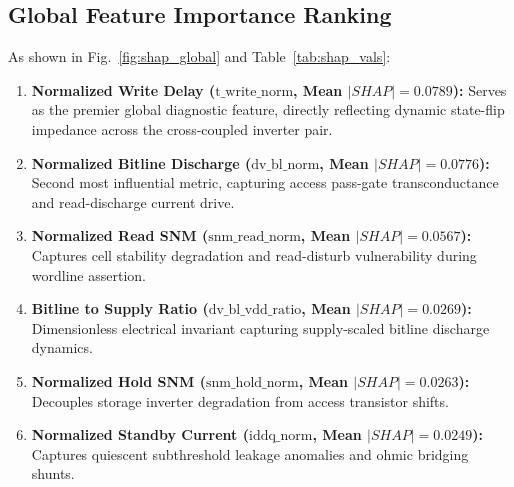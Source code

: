 \documentclass[conference]{IEEEtran}
\begin{document}
\subsection{Global Feature Importance Ranking}
As shown in Fig.~\ref{fig:shap_global} and Table~\ref{tab:shap_vals}:
\begin{enumerate}
    \item \textbf{Normalized Write Delay ($\text{t\_write\_norm}$, Mean $|SHAP| = 0.0789$):} Serves as the premier global diagnostic feature, directly reflecting dynamic state-flip impedance across the cross-coupled inverter pair.
    \item \textbf{Normalized Bitline Discharge ($\text{dv\_bl\_norm}$, Mean $|SHAP| = 0.0776$):} Second most influential metric, capturing access pass-gate transconductance and read-discharge current drive.
    \item \textbf{Normalized Read SNM ($\text{snm\_read\_norm}$, Mean $|SHAP| = 0.0567$):} Captures cell stability degradation and read-disturb vulnerability during wordline assertion.
    \item \textbf{Bitline to Supply Ratio ($\text{dv\_bl\_vdd\_ratio}$, Mean $|SHAP| = 0.0269$):} Dimensionless electrical invariant capturing supply-scaled bitline discharge dynamics.
    \item \textbf{Normalized Hold SNM ($\text{snm\_hold\_norm}$, Mean $|SHAP| = 0.0263$):} Decouples storage inverter degradation from access transistor shifts.
    \item \textbf{Normalized Standby Current ($\text{iddq\_norm}$, Mean $|SHAP| = 0.0249$):} Captures quiescent subthreshold leakage anomalies and ohmic bridging shunts.
\end{enumerate}

\begin{table}[t]
\centering
\caption{Top Invariant Features Ranked by Mean Absolute SHAP Value (1,350 Authentic Samples)}
\label{tab:shap_vals}
\end{table}
\end{document}
